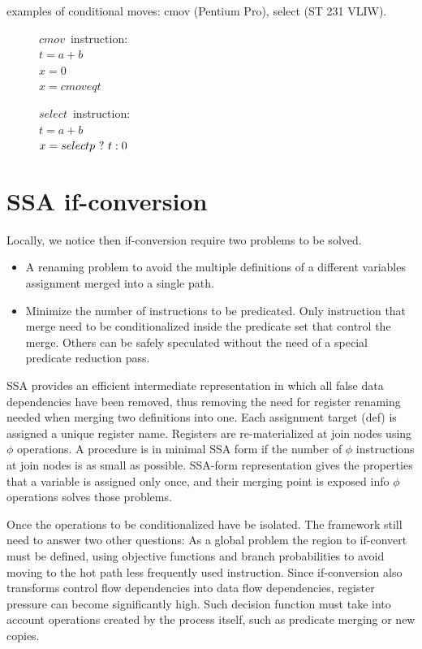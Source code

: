 examples of conditional moves: cmov (Pentium Pro), select (ST 231 VLIW).

\begin{figure}
\begin{minipage}[t]{4cm}
\mbox{$cmov$ instruction:} \\
$t = a + b $ \\
$x = 0 $ \\
$x = cmoveq t $ \\
\end{minipage}
\begin{minipage}[t]{4cm}
\mbox{$select$ instruction:} \\
$t = a + b $ \\
$x = select p ~?~ t : 0 $ \\
\end{minipage}
\label{fig:spec}
\end{figure}

\section{SSA if-conversion}

Locally, we notice then if-conversion require two problems to be solved.
\begin{itemize}
\item A renaming problem to avoid the multiple definitions of a different variables assignment merged into a single path. 
\item Minimize the number of instructions to be predicated. Only instruction that merge need to be conditionalized inside the predicate set that control the merge. Others can be safely speculated without the need of a special predicate reduction pass. 
\end {itemize}

SSA \cite{BriggsSSA} provides an efficient intermediate representation in which all false data dependencies have been removed, thus removing the need for register renaming needed when merging two definitions into one. Each assignment target (def) is assigned a unique register name. Registers are re-materialized at join nodes using $\phi$ operations. A procedure is in minimal SSA form if the number of $\phi$ instructions at join nodes is as small as possible. SSA-form representation gives the properties that a variable is assigned only once, and their merging point is exposed info $\phi$ operations solves those problems. 

Once the operations to be conditionalized have be isolated. The framework still need to answer two other questions: As a global problem the region to if-convert must be defined, using objective functions and branch probabilities to avoid moving to the hot path less frequently used instruction. Since if-conversion also transforms control flow dependencies into data flow dependencies, register pressure can become significantly high. Such decision function must take into account operations created by the process itself, such as predicate merging or new copies. 


